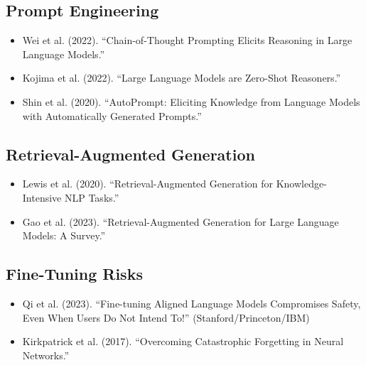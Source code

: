 \documentclass{article}
\begin{document}
\subsection{Prompt Engineering}
\begin{itemize}
\item Wei et al. (2022). ``Chain-of-Thought Prompting Elicits Reasoning in Large Language Models.''
\item Kojima et al. (2022). ``Large Language Models are Zero-Shot Reasoners.''
\item Shin et al. (2020). ``AutoPrompt: Eliciting Knowledge from Language Models with Automatically Generated Prompts.''
\end{itemize}

\subsection{Retrieval-Augmented Generation}
\begin{itemize}
\item Lewis et al. (2020). ``Retrieval-Augmented Generation for Knowledge-Intensive NLP Tasks.''
\item Gao et al. (2023). ``Retrieval-Augmented Generation for Large Language Models: A Survey.''
\end{itemize}

\subsection{Fine-Tuning Risks}
\begin{itemize}
\item Qi et al. (2023). ``Fine-tuning Aligned Language Models Compromises Safety, Even When Users Do Not Intend To!'' (Stanford/Princeton/IBM)
\item Kirkpatrick et al. (2017). ``Overcoming Catastrophic Forgetting in Neural Networks.''
\end{itemize}
\end{document}
